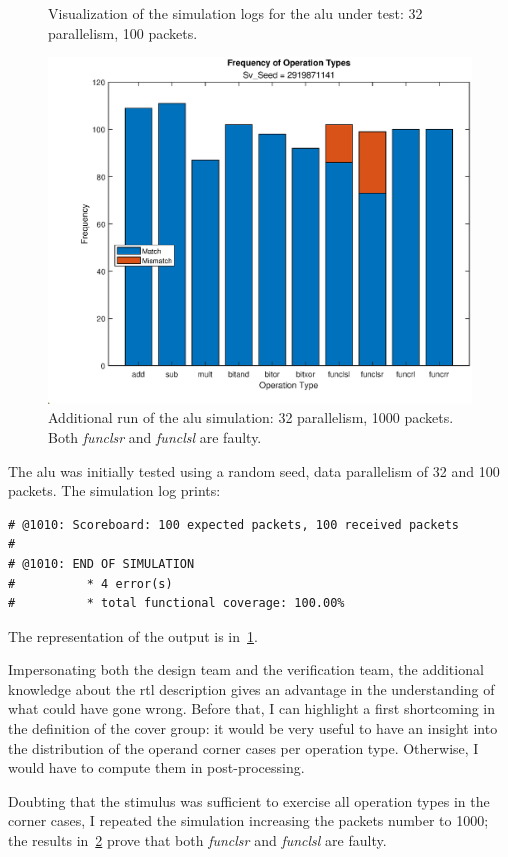 \begin{figure}
    \caption{Visualization of the simulation logs for the \ac{alu} under test: \qty{32}{\bit} parallelism, \num{100} packets.}
    \label{fig:alu}
\end{figure}

\begin{figure}
    \centering
    \includegraphics[width=.8\textwidth]{fig/alu_opdist_1000.eps}
    \caption{Additional run of the \ac{alu} simulation: \qty{32}{\bit} parallelism, \num{1000} packets. Both \emph{funclsr} and \emph{funclsl} are faulty.}
    \label{fig:alu_1000}
\end{figure}

The \ac{alu} was initially tested using a random seed, data parallelism of \qty{32}{\bit} and \num{100} packets. The simulation log prints:
\begin{verbatim}
# @1010: Scoreboard: 100 expected packets, 100 received packets
# 
# @1010: END OF SIMULATION
#          * 4 error(s)
#          * total functional coverage: 100.00%
\end{verbatim}
The representation of the output is in~\cref{fig:alu}. 

Impersonating both the design team and the verification team, the additional knowledge about the \ac{rtl} description gives an advantage in the understanding of what could have gone wrong. Before that, I can highlight a first shortcoming in the definition of the cover group: it would be very useful to have an insight into the distribution of the operand corner cases per operation type. Otherwise, I would have to compute them in post-processing. 

Doubting that the stimulus was sufficient to exercise all operation types in the corner cases, I repeated the simulation increasing the packets number to \num{1000}; the results in~\cref{fig:alu_1000} prove that both \emph{funclsr} and \emph{funclsl} are faulty.

